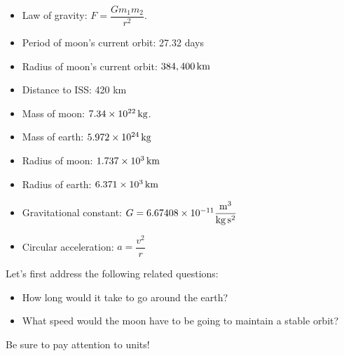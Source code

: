 \documentclass{ximera}
\begin{document}
\begin{problem}
\begin{itemize}
\item Law of gravity:  $F=\dfrac{Gm_1m_2}{r^2}$.
\item Period of moon's current orbit:  27.32 days
\item Radius of moon's current orbit:  $384,400 \, \rm{km}$
\item Distance to ISS: 420 km
\item Mass of moon: $7.34\times 10^{22}\, \rm{kg}$.
\item Mass of earth: $5.972\times 10^{24}\, \rm{kg}$
\item Radius of moon: $1.737\times 10^3\, \rm{km}$
\item Radius of earth: $6.371\times 10^3\, \rm{km}$
\item Gravitational constant:  $G = 6.67408\times 10^{-11} \dfrac{\rm{m}^3}{ \rm{kg} \, \rm{ s}^2}$
\item Circular acceleration: $a=\dfrac{v^2}{r}$
\end{itemize}
 
\end{problem}

\begin{problem}
Let's first address the following related questions: 
\begin{itemize}
\item How long would it take to go around the earth? 
\item What speed would the moon have to be going to maintain a stable orbit? 
\end{itemize}
Be sure to pay attention to units!  
\end{problem}

%
%
%
\end{document}
